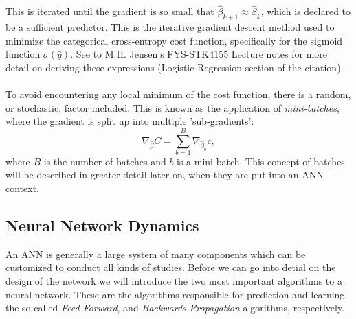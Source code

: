             This is iterated until the gradient is so small that $\hat{\beta}_{k+1} \approx \hat{\beta}_k$, which is declared to be a sufficient predictor. This is the iterative gradient descent method used to minimize the categorical cross-entropy cost function, specifically for the sigmoid function $\sigma (\hat{y})$. See to M.H. Jensen's FYS-STK4155 Lecture notes for more detail on deriving these expressions \cite{lecturenotes} (Logistic Regression section of the citation).\\\\
            To avoid encountering any local minimum of the cost function, there is a random, or stochastic, factor included. This is known as the application of \textit{mini-batches}, where the gradient is split up into multiple 'sub-gradients':
            \begin{equation}
                \nabla_{\hat{\beta}} C = \sum^{B}_{b=1} \nabla_{\hat{\beta}_b} c,
            \end{equation}
            where $B$ is the number of batches and $b$ is a mini-batch. This concept of batches will be described in greater detail later on, when they are put into an ANN context.
    
    \subsection{Neural Network Dynamics}
        An ANN is generally a large system of many components which can be customized to conduct all kinds of studies. Before we can go into detial on the design of the network we will introduce the two most important algorithms to a neural network. These are the algorithms responsible for prediction and learning, the so-called \textit{Feed-Forward}, and \textit{Backwards-Propagation} algorithms, respectively.
